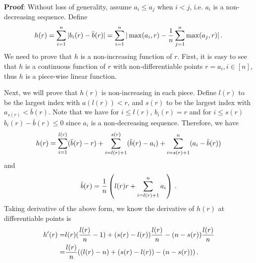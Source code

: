 \documentclass[anon,12pt]{colt2021} %
\begin{document}
{ \textbf{Proof}:}
Without loss of generality, assume $a_i \leq a_j$ when $i < j$, i.e. $a_i$ is a non-decreasing sequence. Define 
\begin{align}\notag
h(r) = \sum_{i=1}^n |b_i(r) - \bar b(r)| = \sum_{i=1}^n |\max (a_i,r) - \frac{1}{n}\sum_{j=1}^n \max(a_j,r)|\, .
\end{align}
We need to prove that $h$ is a non-increasing function of $r$. 
First,
it is easy to see that $h$ is a continuous function of $r$ with non-differentiable points $r = a_i, i \in [n]$, thus $h$ is a piece-wise linear function.

Next, we will prove that $h(r)$ is  non-increasing in each piece.
Define $ l(r)$ to be the largest index with $a(l(r)) < r$, and $s(r)$ to be the largest index with $a_{s(r)} < \bar b(r)$. Note that we have for $i \leq l(r)$, $b_i(r) = r$ and for $i \leq s(r)$ $b_i(r) - \bar b(r) \leq 0$ since $a_i$ is a non-decreasing sequence. 
Therefore, we have 
\begin{align}\notag
h(r) = \sum_{i=1}^{l(r)} (\bar b(r) - r) + \sum_{i= l(r)+1} ^{s(r) } (\bar b(r) - a_i) + \sum_{i= s(r)+1}^n (a_i - \bar b(r))
\end{align}
and 
\begin{align}\notag
\bar b(r) = \frac{1}{n}\left (l(r) r + \sum_{i=l(r)+1}^n a_i\right) \, .
\end{align}
Taking derivative of the above form, we know the derivative of $h(r)$ at differentiable points is
\begin{align}\notag
\begin{split}
h'(r) = &l(r) (\frac{l(r)}{n}-1) + (s(r)-l(r)) \frac{l(r)}{n} - (n-s(r)) \frac{l(r)}{n}  \\
= & \frac{l(r)}{n} ((l(r) - n) + (s(r) - l(r)) - (n-s(r))) \, .
\end{split}
\end{align}
\end{document}

